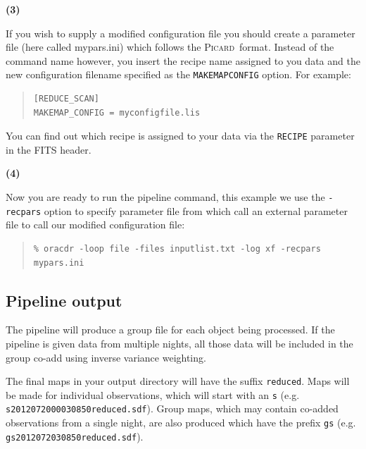 \documentclass[twoside,11pt]{article}
\newcommand{\xref}[3]{#1}
\newcommand{\xlabel}[1]{}
\renewcommand{\_}{\texttt{\symbol{95}}}
\newenvironment{myquote}{\begin{quote}\begin{small}}{\end{small}\end{quote}}
\newcommand{\picard}{\xref{\textsc{Picard}}{sun265}{}}
\begin{document}
\begin{minipage}[t]{0.05\linewidth}
\textbf{(3)}
\end{minipage}
\begin{minipage}[t]{0.95\linewidth}
If you wish to supply a modified configuration file you should create
a parameter file (here called mypars.ini) which follows the \picard\
format. Instead of the command name however, you insert the recipe
name assigned to you data and the new configuration filename specified
as the \texttt{MAKEMAP\_CONFIG} option. For example:
\begin{myquote}
\begin{verbatim}
[REDUCE_SCAN]
MAKEMAP_CONFIG = myconfigfile.lis
 \end{verbatim}
\end{myquote}
\end{minipage}
You can find out which recipe is assigned to your data via the
\texttt{RECIPE} parameter in the FITS header.

\begin{minipage}[t]{0.05\linewidth}
\textbf{(4)}
\end{minipage}
\begin{minipage}[t]{0.95\linewidth}
Now you are ready to run the pipeline command, this example we use the
\texttt{-recpars} option to specify parameter file from which call an
external parameter file to call our modified configuration file:
\begin{myquote}
\begin{verbatim}
% oracdr -loop file -files inputlist.txt -log xf -recpars mypars.ini
\end{verbatim}
\end{myquote}
\end{minipage}

\subsection{\xlabel{pl_output}Pipeline output}

The pipeline will produce a group file for each object being
processed. If the pipeline is given data from multiple nights, all
those data will be included in the group co-add using inverse variance
weighting.

The final maps in your output directory will have the suffix
\texttt{\_reduced}. Maps will be made for individual observations,
which will start with an \texttt{s} (e.g.
\texttt{s20120720\_00030\_850\_reduced.sdf}). Group maps, which may contain
co-added observations from a single night, are also produced which
have the prefix \texttt{gs} (e.g. \texttt{gs20120720\_30\_850\_reduced.sdf}).
\end{document}
